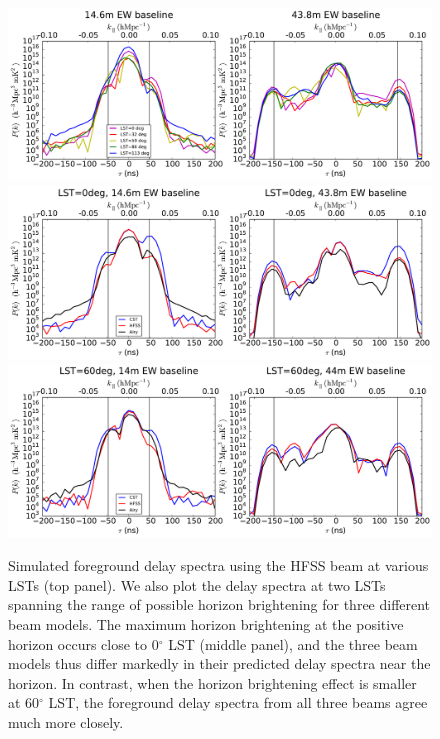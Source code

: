 \documentclass{emulateapj}
\begin{document}
\begin{figure}[h]
\centering
\includegraphics[width=6in]{nithya_fg_pspec_all_lst.pdf}
\includegraphics[width=6in]{nithya_fg_pspec_lst0deg.pdf}
\includegraphics[width=6in]{nithya_fg_pspec_lst60deg.pdf}
\caption{Simulated foreground delay spectra using the HFSS beam at various LSTs (top panel). We also plot the delay spectra at two LSTs spanning the range of possible horizon brightening for three different beam models. The maximum horizon brightening at the positive horizon occurs close to 0$^\circ$ LST (middle panel), and the three beam models thus differ markedly in their predicted delay spectra near the horizon. In contrast, when the horizon brightening effect is smaller at 60$^\circ$ LST, the foreground delay spectra from all three beams agree much more closely.}
\label{fig:delayspec}
\end{figure}
\end{document}
